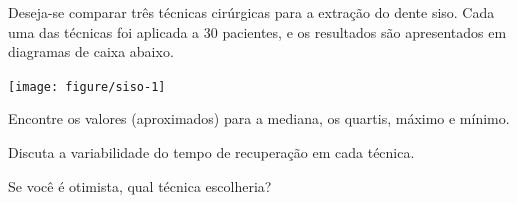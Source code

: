 \documentclass[a4paper,11pt,fleqn]{article}\usepackage[]{graphicx}\usepackage[]{color}
\newenvironment{knitrout}{}{} %
\theoremstyle{definition}
\begin{document}
\begin{compactenum}[5.] %
\item Deseja-se comparar três técnicas cirúrgicas para a extração do
  dente siso. Cada uma das técnicas foi aplicada a 30 pacientes, e os
  resultados são apresentados em diagramas de caixa abaixo.\vspace{1em}
\begin{knitrout}\small
{}\color{fgcolor}

{\centering \texttt{[image: figure/siso-1]} 

}



\end{knitrout}
\begin{compactenum}
\item Encontre os valores (aproximados) para a mediana, os quartis,
  máximo e mínimo.

\item Discuta a variabilidade do tempo de recuperação em cada técnica.
\item Se você é otimista, qual técnica escolheria?
\end{compactenum}
\end{compactenum}
\end{document}
